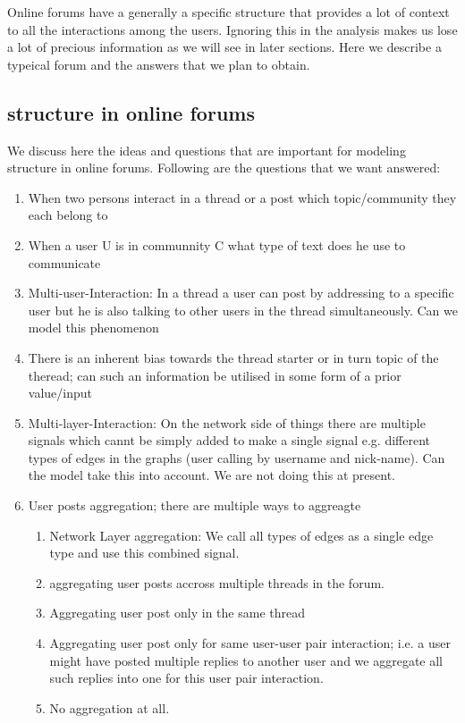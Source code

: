 Online forums have a generally a specific structure that provides a lot of
context to all the interactions among the users. Ignoring this in the analysis
makes us lose a lot of precious information as we will see in later sections.
Here we describe a typeical forum and the answers that we plan to obtain.

\subsection{structure in online forums}
We discuss here the ideas and questions that are important for modeling
structure in online forums. Following are the questions that we want answered:
\begin{enumerate}
  \item When two persons interact in a thread or a post which topic/community they
each belong to
	\item When a user U is in communnity C what type of text does he use to
	communicate
	\item Multi-user-Interaction: In a thread a user can post by addressing to a
	specific user but he is also talking to other users in the thread simultaneously. Can we model this
	phenomenon
	\item There is an inherent bias towards the thread starter or in turn topic of
	the theread; can such an information be utilised in some form of a prior
	value/input
	\item Multi-layer-Interaction: On the network side of things there are multiple
	signals which cannt be simply added to make a single signal e.g. different
	types of edges in the graphs (user calling by username and nick-name). Can the
	model take this into account. We are not doing this at present.
	\item User posts aggregation; there are multiple ways to aggreagte
	\begin{enumerate}
		\item Network Layer aggregation: We call all types of edges as a single
		edge type and use this combined signal. 
		\item aggregating user posts accross multiple threads in the forum.
		\item Aggregating user post only in the same thread
		\item Aggregating user post only for same user-user pair interaction; i.e. a user might have
		posted multiple replies to another user and we aggregate all such replies into
		one for this user pair interaction.
		\item No aggregation at all.
	\end{enumerate}
\end{enumerate}

